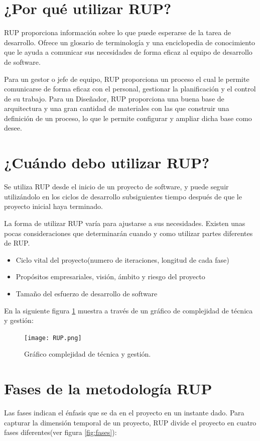 \documentclass[spanish]{udpreport}
\begin{document}
\section{¿Por qué utilizar RUP?}
\label{sec: Por que utilizar RUP}
RUP proporciona información sobre lo que puede esperarse de la tarea de desarrollo. Ofrece un glosario de terminología y una enciclopedia de conocimiento que le ayuda a comunicar sus necesidades de forma eficaz al equipo de  desarrollo de software. \par
Para un gestor o jefe de equipo, RUP proporciona  un proceso el cual le permite comunicarse de forma eficaz con el personal, gestionar la planificación y el control de su trabajo. Para un Diseñador, RUP proporciona una buena base de arquitectura y una gran cantidad de materiales con las que construir una definición de un proceso, lo que le permite configurar y ampliar dicha base como desee.

\section{¿Cuándo debo utilizar RUP?}
\label{sec: Cuando debo utilizar RUP}
Se utiliza RUP desde el inicio de  un proyecto de software, y puede seguir utilizándolo en los ciclos de desarrollo subsiguientes tiempo después de que le proyecto inicial haya terminado. \par
La forma de utilizar RUP varía para ajustarse a sus necesidades. Existen unas pocas consideraciones que determinarán cuando y como utilizar partes diferentes de RUP.
\begin{itemize}
\item Ciclo vital del proyecto(numero de iteraciones, longitud de cada fase)
\item Propósitos empresariales, visión, ámbito y riesgo del proyecto
\item Tamaño del esfuerzo de desarrollo de software
\end{itemize}
En la siguiente figura \ref{fig:grafico} muestra a través de un gráfico de complejidad de técnica y gestión:

\begin{figure}[h]
	\centering
	\texttt{[image: RUP.png]}
	\caption{\label{fig:grafico}Gráfico complejidad de técnica y gestión.}
\end{figure}

\section{Fases de la metodología RUP}
Las fases indican el énfasis que se da en el proyecto en un instante dado. Para capturar la dimensión temporal de un proyecto, RUP divide el proyecto en cuatro fases diferentes(ver figura \ref{fig:fases}):
\end{document}
